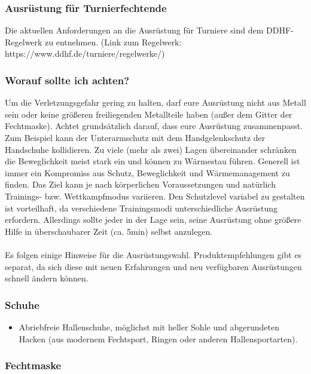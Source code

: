 \subsubsection*{Ausrüstung für Turnierfechtende}

Die aktuellen Anforderungen an die Ausrüstung für Turniere sind dem DDHF-Regelwerk zu entnehmen.
(Link zum Regelwerk: https://www.ddhf.de/turniere/regelwerke/)

\subsubsection*{Worauf sollte ich achten?}

Um die Verletzungsgefahr gering zu halten, darf eure Ausrüstung nicht aus Metall sein oder keine größeren freiliegenden Metallteile haben (außer dem Gitter der Fechtmaske).
Achtet grundsätzlich darauf, dass eure Ausrüstung zusammenpasst.
Zum Beispiel kann der Unterarmschutz mit dem Handgelenkschutz der Handschuhe kollidieren.
Zu viele (mehr als zwei) Lagen übereinander schränken die Beweglichkeit meist stark ein und können zu Wärmestau führen.
Generell ist immer ein Kompromiss aus Schutz, Beweglichkeit und Wärmemanagement zu finden.
Das Ziel kann je nach körperlichen Voraussetzungen und natürlich Trainings- bzw. Wettkampfmodus variieren.
Den Schutzlevel variabel zu gestalten ist vorteilhaft, da verschiedene Trainingsmodi unterschiedliche Ausrüstung erfordern.
Allerdings sollte jeder in der Lage sein, seine Ausrüstung ohne größere Hilfe in überschaubarer Zeit (ca. 5min) selbst anzulegen.
\\
\\
Es folgen einige Hinweise für die Ausrüstungswahl.
Produktempfehlungen gibt es separat, da sich diese mit neuen Erfahrungen und neu verfügbaren Ausrüstungen schnell ändern können.

\newpage

\subsubsection*{Schuhe}

\begin{itemize}
    \item Abriebfreie Hallenschuhe, möglichst mit heller Sohle und abgerundeten Hacken (aus modernem Fechtsport, Ringen oder anderen Hallensportarten).
\end{itemize}

\subsubsection*{Fechtmaske}

